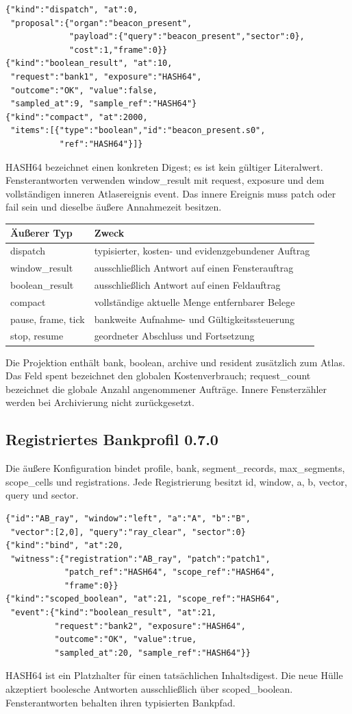 \documentclass[11pt,a4paper]{article}
\begin{document}
\begin{lstlisting}
{"kind":"dispatch", "at":0,
 "proposal":{"organ":"beacon_present",
             "payload":{"query":"beacon_present","sector":0},
             "cost":1,"frame":0}}
{"kind":"boolean_result", "at":10,
 "request":"bank1", "exposure":"HASH64",
 "outcome":"OK", "value":false,
 "sampled_at":9, "sample_ref":"HASH64"}
{"kind":"compact", "at":2000,
 "items":[{"type":"boolean","id":"beacon_present.s0",
           "ref":"HASH64"}]}
\end{lstlisting}
HASH64 bezeichnet einen konkreten Digest; es ist kein gültiger
Literalwert. Fensterantworten verwenden window\_result mit request,
exposure und dem vollständigen inneren Atlasereignis event.
Das innere Ereignis muss patch oder fail sein und dieselbe
äußere Annahmezeit besitzen.

\begin{tabularx}{\linewidth}{@{}lY@{}}\toprule
Äußerer Typ & Zweck\\\midrule
dispatch & typisierter, kosten- und evidenzgebundener Auftrag\\
window\_result & ausschließlich Antwort auf einen Fensterauftrag\\
boolean\_result & ausschließlich Antwort auf einen Feldauftrag\\
compact & vollständige aktuelle Menge entfernbarer Belege\\
pause, frame, tick & bankweite Aufnahme- und Gültigkeitssteuerung\\
stop, resume & geordneter Abschluss und Fortsetzung\\\bottomrule
\end{tabularx}

Die Projektion enthält bank, boolean, archive und resident zusätzlich
zum Atlas. Das Feld spent bezeichnet den globalen Kostenverbrauch;
request\_count bezeichnet die globale Anzahl angenommener Aufträge.
Innere Fensterzähler werden bei Archivierung nicht zurückgesetzt.

\clearpage
\subsection{Registriertes Bankprofil 0.7.0}
Die äußere Konfiguration bindet profile, bank, segment\_records,
max\_segments, scope\_cells und registrations. Jede Registrierung
besitzt id, window, a, b, vector, query und sector.

\begin{lstlisting}
{"id":"AB_ray", "window":"left", "a":"A", "b":"B",
 "vector":[2,0], "query":"ray_clear", "sector":0}
{"kind":"bind", "at":20,
 "witness":{"registration":"AB_ray", "patch":"patch1",
            "patch_ref":"HASH64", "scope_ref":"HASH64",
            "frame":0}}
{"kind":"scoped_boolean", "at":21, "scope_ref":"HASH64",
 "event":{"kind":"boolean_result", "at":21,
          "request":"bank2", "exposure":"HASH64",
          "outcome":"OK", "value":true,
          "sampled_at":20, "sample_ref":"HASH64"}}
\end{lstlisting}
HASH64 ist ein Platzhalter für einen tatsächlichen Inhaltsdigest.
Die neue Hülle akzeptiert boolesche Antworten ausschließlich über
scoped\_boolean. Fensterantworten behalten ihren typisierten Bankpfad.
\end{document}
